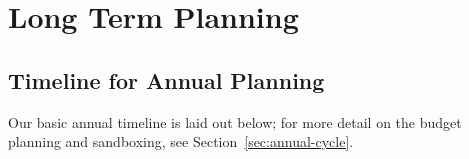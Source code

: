 \section{Long Term Planning}
\label{sec:long-term-plan}

\subsection{Timeline for Annual Planning}
\label{sec:annual-planning-timeline}

Our basic annual timeline is laid out below; for more detail on the budget planning and sandboxing, see Section~\ref{sec:annual-cycle}.

